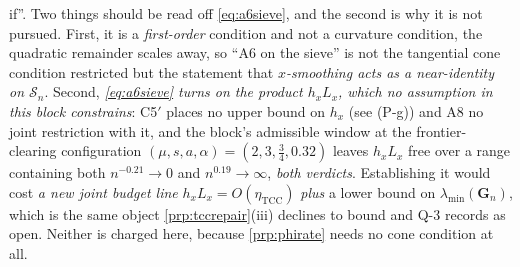 \begin{remark}
if''.
Two things should be read off \eqref{eq:a6sieve}, and the second is why it is not pursued.
First, it is a \emph{first-order} condition and not a curvature condition, the quadratic remainder
scales away, so ``A6 on the sieve'' is not the tangential cone condition restricted but the
statement that \emph{$x$-smoothing acts as a near-identity on $\mathcal S_n$}. Second,
\emph{\eqref{eq:a6sieve} turns on the product $h_xL_x$, which no assumption in this block constrains}:
C5$'$ places no upper bound on $h_x$ (see (P-g)) and A8 no joint restriction with it, and the block's
admissible window at the frontier-clearing configuration $(\mu,s,a,\alpha)=(2,3,\tfrac34,0.32)$ leaves
$h_xL_x$ free over a range containing both $n^{-0.21}\to0$ and $n^{0.19}\to\infty$, \emph{both
verdicts}. Establishing it would cost \emph{a new joint budget
line} $h_xL_x=O(\eta_{\mathrm{TCC}})$ \emph{plus} a lower bound on $\lambda_{\min}(\mathbf G_n)$, which
is the same object \cref{prp:tccrepair}(iii) declines to bound and Q-3 records as open. Neither is
charged here, because \cref{prp:phirate} needs no cone condition at all.


\end{remark}
